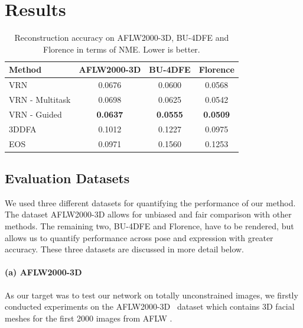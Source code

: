 
\section{Results} \label{S:Results}

\begin{table}
  \caption[Numerical performance of 3D face
  reconstruction]{Reconstruction accuracy on AFLW2000-3D, BU-4DFE and
    Florence in terms of NME. Lower is better.}
  \label{tab:overview}
  \centering
  \small
  \begin{tabular}{|l||c|c|c|}
    \hline
    \textbf{Method}   & \textbf{AFLW2000-3D} & \textbf{BU-4DFE} & \textbf{Florence} \\
    \hline\hline
    VRN & 0.0676   & 0.0600 & 0.0568   \\
    VRN - Multitask   & 0.0698        & 0.0625     & 0.0542        \\
    VRN - Guided    & \textbf{0.0637}   & \textbf{0.0555} & \textbf{0.0509}   \\
    \hline
    3DDFA~\cite{zhu2016face}             & 0.1012   & 0.1227 & 0.0975   \\
    EOS~\cite{huber2016multiresolution}  & 0.0971   & 0.1560 & 0.1253   \\
    \hline
  \end{tabular}
  \vspace{-4mm}
\end{table}


\subsection{Evaluation Datasets}

We used three different datasets for quantifying the performance of
our method. The dataset AFLW2000-3D allows for unbiased and fair
comparison with other methods. The remaining two, BU-4DFE and
Florence, have to be rendered, but allows us to quantify performance
across pose and expression with greater accuracy. These three datasets
are discussed in more detail below.

\paragraph{(a) AFLW2000-3D} As our target was to test
our network on totally unconstrained images, we firstly conducted
experiments on the AFLW2000-3D~\cite{zhu2016face} dataset which
contains 3D facial meshes for the first 2000 images from AFLW
\cite{aflw2011}.

